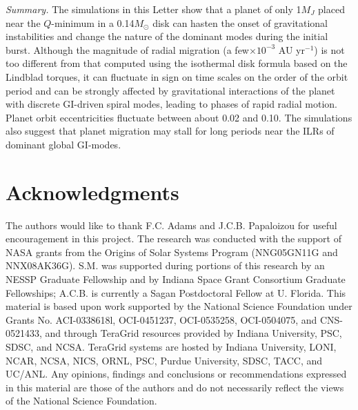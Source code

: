 \documentclass[12pt,manuscript,authoryear]{aastex}
\begin{document}
{\it Summary.} The simulations in this Letter show that a planet of only 1$M_J$ placed near the $Q$-minimum in a 0.14$M_{\odot}$ disk can hasten the onset of gravitational instabilities and change the nature of the dominant modes during the initial burst. Although the magnitude of radial migration (a few$\times10^{-3}$ AU yr$^{-1}$) is not too different from that computed using the \citet{tanaka2002}  isothermal disk formula based on the Lindblad torques, it can fluctuate in sign on time scales on the order of the orbit period and can be strongly affected by gravitational interactions of the planet with discrete GI-driven spiral modes, leading to phases of rapid radial motion. Planet orbit eccentricities fluctuate between about 0.02 and 0.10. The simulations also suggest that planet migration may stall for long periods near the ILRs of dominant global GI-modes.

\section{Acknowledgments}

The authors would like to thank F.C. Adams and J.C.B. Papaloizou for useful encouragement in this project. The research was conducted with the support of NASA grants from the Origins of Solar Systems  Program (NNG05GN11G and NNX08AK36G). S.M. was supported during portions of this research by an NESSP Graduate Fellowship and by Indiana Space Grant Consortium Graduate Fellowships; A.C.B. is currently a Sagan Postdoctoral Fellow at U. Florida. This material is based upon work supported by the National Science Foundation under Grants No. ACI-0338618l, OCI-0451237, OCI-0535258, OCI-0504075, and CNS-0521433, and through TeraGrid resources provided by Indiana University, PSC, SDSC, and NCSA. TeraGrid systems are hosted by Indiana University, LONI, NCAR, NCSA, NICS, ORNL, PSC, Purdue University, SDSC, TACC, and UC/ANL. Any opinions, findings and conclusions or recommendations expressed in this material are those of the authors and do not necessarily reflect the views of the National Science Foundation. 
\end{document}
